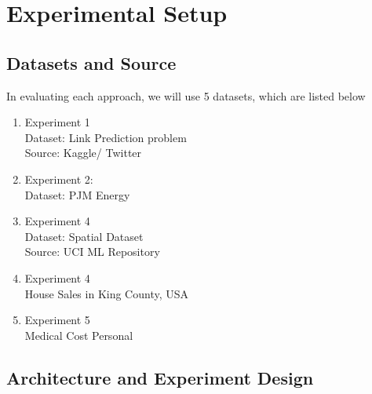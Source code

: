 \documentclass[runningheads]{llncs}
\begin{document}

\section{Experimental Setup}
\subsection{Datasets and Source}

In evaluating each approach, we will use 5 datasets, which are listed below

\begin{enumerate}
    \item Experiment 1 \\
    Dataset: Link Prediction problem \\
    Source: Kaggle/ Twitter
    \item Experiment 2: \\
    Dataset: PJM Energy
    \item Experiment 4 \\
    Dataset: Spatial Dataset \\
    Source: UCI ML Repository
    \item Experiment 4\\
    House Sales in King County, USA
    \item Experiment 5 \\
    Medical Cost Personal \\
\end{enumerate}




\subsection{Architecture and Experiment Design}
\end{document}
